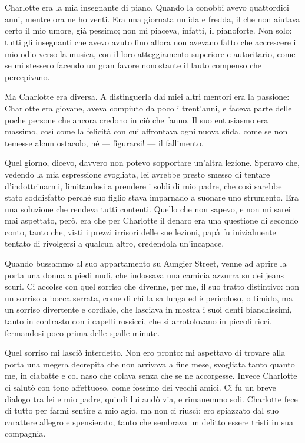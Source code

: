 \documentclass[a4paper,11pt,oneside,openright,final]{memoir}
\begin{document}
\mainmatter

\chapter{}
Charlotte era la mia insegnante di piano. Quando la conobbi avevo quattordici
anni, mentre ora ne ho venti. Era una giornata umida e fredda, il che non
aiutava certo il mio umore, già pessimo; non mi piaceva, infatti, il pianoforte.
Non solo: tutti gli insegnanti che avevo avuto fino allora non avevano fatto che
accrescere il mio odio verso la musica, con il loro atteggiamento superiore e
autoritario, come se mi stessero facendo un gran favore nonostante il lauto
compenso che percepivano.

Ma Charlotte era diversa. A distinguerla dai miei altri mentori era la passione:
Charlotte era giovane, aveva compiuto da poco i trent'anni, e faceva parte delle
poche persone che ancora credono in ciò che fanno. Il suo entusiasmo era
massimo, così come la felicità con cui affrontava ogni nuova sfida, come se non
temesse alcun ostacolo, né --- figurarsi! --- il fallimento.

Quel giorno, dicevo, davvero non potevo sopportare un'altra lezione. Speravo
che, vedendo la mia espressione svogliata, lei avrebbe presto smesso di tentare
d'indottrinarmi, limitandosi a prendere i soldi di mio padre, che così sarebbe
stato soddisfatto perché suo figlio stava imparnado a suonare uno strumento. Era
una soluzione che rendeva tutti contenti. Quello che non sapevo, e non mi sarei
mai aspettato, però, era che per Charlotte il denaro era una questione di
secondo conto, tanto che, visti i prezzi irrisori delle sue lezioni, papà fu
inizialmente tentato di rivolgersi a qualcun altro, credendola un'incapace.

Quando bussammo al suo appartamento su Aungier Street, venne ad aprire la porta
una donna a piedi nudi, che indossava una camicia azzurra su dei jeans scuri. Ci
accolse con quel sorriso che divenne, per me, il suo tratto distintivo: non un
sorriso a bocca serrata, come di chi la sa lunga ed è pericoloso, o timido, ma
un sorriso divertente e cordiale, che lasciava in mostra i suoi denti
bianchissimi, tanto in contrasto con i capelli rossicci, che si arrotolovano in
piccoli ricci, fermandosi poco prima delle spalle minute.

Quel sorriso mi lasciò interdetto. Non ero pronto: mi aspettavo di trovare alla
porta una megera decrepita che non arrivava a fine mese, svogliata tanto quanto
me, in ciabatte e col naso che colava senza che se ne accorgesse. Invece
Charlotte ci salutò con tono affettuoso, come fossimo dei vecchi amici. Ci fu un
breve dialogo tra lei e mio padre, quindi lui andò via, e rimanemmo soli.
Charlotte fece di tutto per farmi sentire a mio agio, ma non ci riuscì: ero
spiazzato dal suo carattere allegro e spensierato, tanto che sembrava un delitto
essere tristi in sua compagnia.
\end{document}
